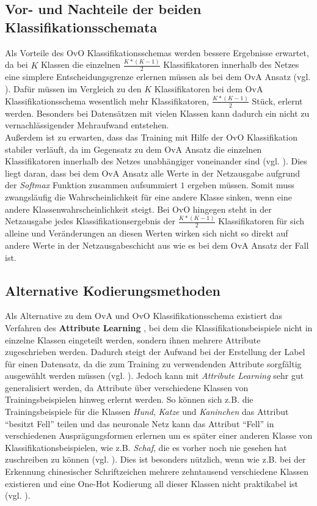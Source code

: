 \subsection{Vor- und Nachteile der beiden Klassifikationsschemata}
Als Vorteile des OvO Klassifikationsschemas werden bessere Ergebnisse erwartet, da bei $K$ Klassen die einzelnen $\frac{K*(K-1)}{2}$ Klassifikatoren innerhalb des Netzes eine simplere Entscheidungsgrenze erlernen müssen als bei dem OvA Ansatz (vgl. \cite{pawaraPaper}).
Dafür müssen im Vergleich zu den $K$ Klassifikatoren bei dem OvA Klassifikationsschema wesentlich mehr Klassifikatoren, $\frac{K*(K-1)}{2}$ Stück, erlernt werden. Besonders bei Datensätzen mit vielen Klassen kann dadurch ein nicht zu vernachlässigender Mehraufwand entstehen.\\

Außerdem ist zu erwarten, dass das Training mit Hilfe der OvO Klassifikation stabiler verläuft, da im Gegensatz zu dem OvA Ansatz die einzelnen Klassifikatoren innerhalb des Netzes unabhängiger voneinander sind (vgl. \cite{pawaraPaper}). Dies liegt daran, dass bei dem OvA Ansatz alle Werte in der Netzausgabe aufgrund der \textit{Softmax} Funktion zusammen aufsummiert $1$ ergeben müssen. Somit muss zwangsläufig die Wahrscheinlichkeit für eine andere Klasse sinken, wenn eine andere Klassenwahrscheinlichkeit steigt. Bei OvO hingegen steht in der Netzausgabe jedes Klassifikationsergebnis der $\frac{K*(K-1)}{2}$ Klassifikatoren für sich alleine und Veränderungen an diesen Werten wirken sich nicht so direkt auf andere Werte in der Netzausgabeschicht aus wie es bei dem OvA Ansatz der Fall ist.
\newpage
\subsection{Alternative Kodierungsmethoden}
Als Alternative zu dem OvA und OvO Klassifikationsschema existiert das Verfahren des \textbf{Attribute Learning} \cite{attributeLearning, attributeLearningChinese}, bei dem die Klassifikationsbeispiele nicht in einzelne Klassen eingeteilt werden, sondern ihnen mehrere Attribute zugeschrieben werden. Dadurch steigt der Aufwand bei der Erstellung der Label für einen Datensatz, da die zum Training zu verwendenden Attribute sorgfältig ausgewählt werden müssen (vgl. \cite{pawaraPaper}). Jedoch kann mit \textit{Attribute Learning} sehr gut generalisiert werden, da Attribute über verschiedene Klassen von Trainingsbeispielen hinweg erlernt werden. So können sich z.B. die Trainingsbeispiele für die Klassen \textit{Hund}, \textit{Katze} und \textit{Kaninchen} das Attribut \enquote{besitzt Fell} teilen und das neuronale Netz kann das Attribut \enquote{Fell} in verschiedenen Ausprägungsformen erlernen um es  später einer anderen Klasse von Klassifikationsbeispielen, wie z.B. \textit{Schaf}, die es vorher noch nie gesehen hat zuschreiben zu können (vgl. \cite{attributeLearning}). Dies ist besonders nützlich, wenn wie z.B. bei der Erkennung chinesischer Schriftzeichen mehrere zehntausend verschiedene Klassen existieren und eine One-Hot Kodierung all dieser Klassen nicht praktikabel ist (vgl. \cite{attributeLearningChinese}).\\

